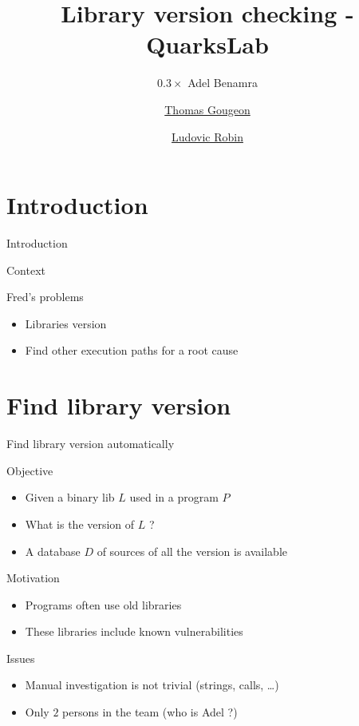 \documentclass[11pt]{beamer}
\author{$0.3\times$ Adel Benamra \and \underline{Thomas Gougeon} \and \underline{Ludovic Robin}}
\title{Library version checking - QuarksLab}
\begin{document}
\begin{frame}
\titlepage
\end{frame}

\begin{frame}
\tableofcontents
\end{frame}

\section{Introduction}
\begin{frame}{Introduction}

\begin{block}{Context}


\end{block}

\begin{block}{Fred's problems}

\begin{itemize}
	\item Libraries version
	\item Find other execution paths for a root cause
\end{itemize}

\end{block}

\end{frame}

\section{Find library version}
\begin{frame}{Find library version automatically}

\begin{block}{Objective}
	\begin{itemize}
		\item Given a binary lib $L$ used in a program $P$
		\item What is the version of $L$ ?
		\item A database $D$ of sources of all the version is available
	\end{itemize}
\end{block}

\begin{block}{Motivation}
	\begin{itemize}
		\item Programs often use old libraries
		\item These libraries include known vulnerabilities
	\end{itemize}
\end{block}

\begin{block}{Issues}
	\begin{itemize}
		\item Manual investigation is not trivial (strings, calls, \dots)
		\item Only $2$ persons in the team (who is Adel ?)
	\end{itemize}

\end{block}

\end{frame}
\end{document}
